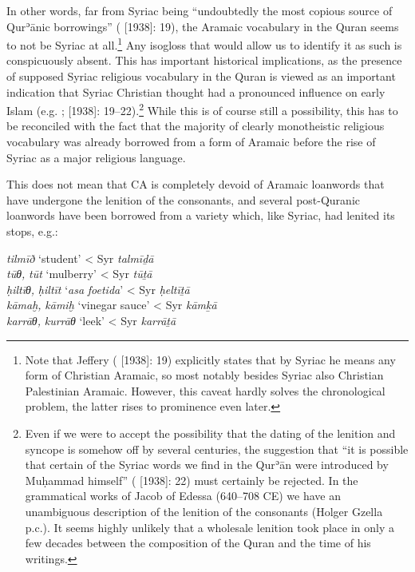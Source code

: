 \documentclass[output=paper]{langsci/langscibook}
\begin{document}
In other words, far from Syriac being “undoubtedly the most copious source of Qurʾānic borrowings” (\citealt{Jeffrey2007} [1938]: 19), the Aramaic vocabulary in the Quran seems to not be Syriac at all.\footnote{Note that Jeffery (\citeyear{Jeffrey2007} [1938]: 19) explicitly states that by Syriac he means any form of Christian Aramaic, so most notably besides Syriac also Christian Palestinian Aramaic. However, this caveat hardly solves the chronological problem, the latter rises to prominence even later.} Any isogloss that would allow us to identify it as such is conspicuously absent. This has important historical implications, as the presence of supposed Syriac religious vocabulary in the Quran is viewed as an important indication that Syriac Christian thought had a pronounced influence on early Islam (e.g. \citealt[82--90]{Mingana1927}; \citealt{Jeffrey2007} [1938]: 19--22).\footnote{Even if we were to accept the possibility that the dating of the lenition and syncope is somehow off by several centuries, the suggestion that “it is possible that certain of the Syriac words we find in the Qurʾān were introduced by Muḥammad himself” (\citealt{Jeffrey2007} [1938]: 22) must certainly be rejected. In the grammatical works of Jacob of Edessa (640–708 CE) we have an unambiguous description of the lenition of the consonants (Holger Gzella p.c.). It seems highly unlikely that a wholesale lenition took place in only a few decades between the composition of the Quran and the time of his writings.} While this is of course still a possibility, this has to be reconciled with the fact that the majority of clearly monotheistic religious vocabulary was already borrowed from a form of Aramaic before the rise of Syriac as a major religious language.

This does not mean that CA is completely devoid of Aramaic loanwords that have undergone the lenition of the consonants, and several post-Quranic loanwords have been borrowed from a variety which, like Syriac, had lenited its stops, e.g.:

\ea
\ea\textit{tilmīð} ‘student’ < Syr \textit{talmīḏā}  \citep[254]{Fraenkel1886}\\
\ex\textit{tūθ,} \textit{tūt} ‘mulberry’ < Syr \textit{tūṯā}  \citep[140]{Fraenkel1886}\\
\ex\textit{ḥiltīθ,} \textit{ḥiltīt} ‘\textit{asa} \textit{foetida}’ < Syr \textit{ḥeltīṯā} \citep[140]{Fraenkel1886}\\
\ex\textit{kāmaḫ,} \textit{kāmiḫ} ‘vinegar sauce’ < Syr \textit{kāmḵā} \citep[288]{Fraenkel1886}\\
\ex\textit{karrāθ,} \textit{kurrāθ} ‘leek’ < Syr \textit{karrāṯā} \citep[144]{Fraenkel1886}
\z
\z
\end{document}
